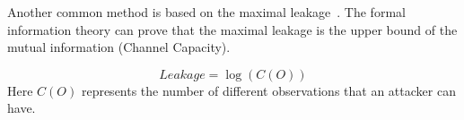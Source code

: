 Another common method is based on the maximal leakage~\cite{10.1007/978-3-642-00596-1_21,10.1007/978-3-642-31424-7_40,182946}.
The formal information theory can prove that the maximal leakage is the upper bound of the mutual 
information (Channel Capacity).

\begin{displaymath}
    \mathit{Leakage} = \log(C(O))
\end{displaymath}
Here $C(O)$ represents the number of different observations that an attacker can have. 







